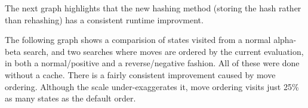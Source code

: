 The next graph highlights that the new hashing method (storing the hash rather than rehashing) has a consistent runtime improvment.

\begin{center}
\end{center}

The following graph shows a comparision of states visited from a normal alpha-beta search, and two searches where moves are ordered by the current evaluation, in both a normal/positive and a reverse/negative fashion. All of these were done without a cache. There is a fairly consistent improvement caused by move ordering. Although the scale under-exaggerates it, move ordering visits just 25\% as many states as the default order.

